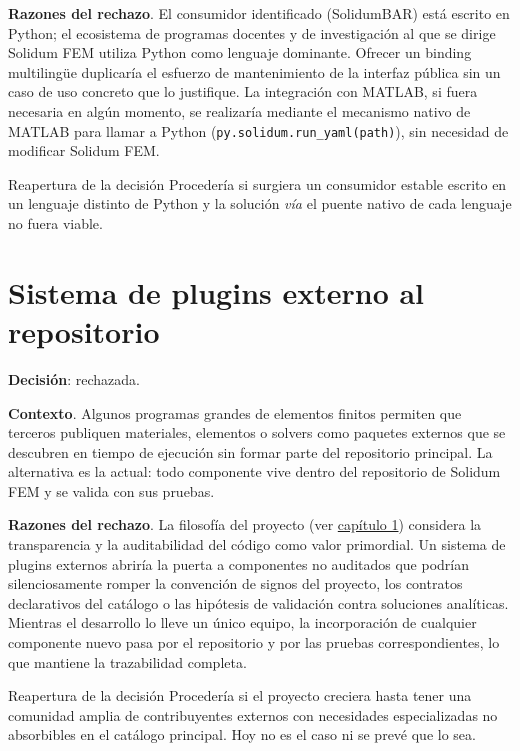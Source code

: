 \documentclass[11pt,oneside]{report}
\begin{document}
\textbf{Razones del rechazo}. El consumidor identificado (SolidumBAR) está escrito en Python; el ecosistema de programas docentes y de investigación al que se dirige Solidum FEM utiliza Python como lenguaje dominante. Ofrecer un binding multilingüe duplicaría el esfuerzo de mantenimiento de la interfaz pública sin un caso de uso concreto que lo justifique. La integración con MATLAB, si fuera necesaria en algún momento, se realizaría mediante el mecanismo nativo de MATLAB para llamar a Python (\texttt{py.\allowbreak{}solidum.\allowbreak{}run\_\allowbreak{}yaml(path)}), sin necesidad de modificar Solidum FEM.

\begin{infobox}{Reapertura de la decisión}
Procedería si surgiera un consumidor estable escrito en un lenguaje distinto de Python y la solución \textit{vía} el puente nativo de cada lenguaje no fuera viable.
\end{infobox}

\section{Sistema de plugins externo al repositorio}

\textbf{Decisión}: rechazada.

\textbf{Contexto}. Algunos programas grandes de elementos finitos permiten que terceros publiquen materiales, elementos o solvers como paquetes externos que se descubren en tiempo de ejecución sin formar parte del repositorio principal. La alternativa es la actual: todo componente vive dentro del repositorio de Solidum FEM y se valida con sus pruebas.

\textbf{Razones del rechazo}. La filosofía del proyecto (ver \hyperref[cap:1]{capítulo 1}) considera la transparencia y la auditabilidad del código como valor primordial. Un sistema de plugins externos abriría la puerta a componentes no auditados que podrían silenciosamente romper la convención de signos del proyecto, los contratos declarativos del catálogo o las hipótesis de validación contra soluciones analíticas. Mientras el desarrollo lo lleve un único equipo, la incorporación de cualquier componente nuevo pasa por el repositorio y por las pruebas correspondientes, lo que mantiene la trazabilidad completa.

\begin{infobox}{Reapertura de la decisión}
Procedería si el proyecto creciera hasta tener una comunidad amplia de contribuyentes externos con necesidades especializadas no absorbibles en el catálogo principal. Hoy no es el caso ni se prevé que lo sea.
\end{infobox}
\end{document}
